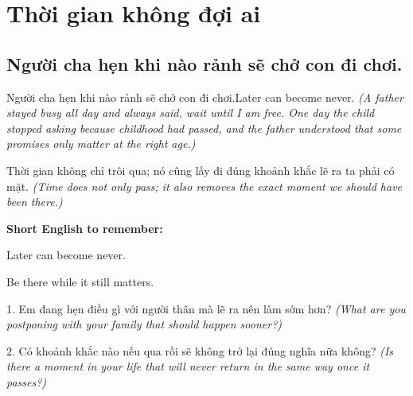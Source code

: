 \chapter{Thời gian không đợi ai}

\section{Người cha hẹn khi nào rảnh sẽ chở con đi chơi.}
\begin{truyen}{Người cha hẹn khi nào rảnh sẽ chở con đi chơi.}{Later can become never.}
\textit{(A father stayed busy all day and always said, wait until I am free. One day the child stopped asking because childhood had passed, and the father understood that some promises only matter at the right age.)}
\end{truyen}
\begin{baihoc}
Thời gian không chỉ trôi qua; nó cũng lấy đi đúng khoảnh khắc lẽ ra ta phải có mặt.
\textit{(Time does not only pass; it also removes the exact moment we should have been there.)}
\end{baihoc}
\begin{ghinhoanh}
\textbf{Short English to remember:}

Later can become never.

Be there while it still matters.
\end{ghinhoanh}
\begin{tuhocnhanh}
1. Em đang hẹn điều gì với người thân mà lẽ ra nên làm sớm hơn? \textit{(What are you postponing with your family that should happen sooner?)}

2. Có khoảnh khắc nào nếu qua rồi sẽ không trở lại đúng nghĩa nữa không? \textit{(Is there a moment in your life that will never return in the same way once it passes?)}
\end{tuhocnhanh}
\ngancach

